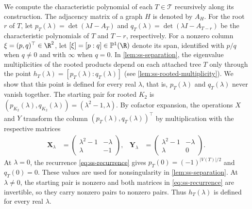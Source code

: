We compute the characteristic polynomial of each $T\in\mathcal T$
recursively along its construction.
The adjacency matrix of a graph $H$ is denoted by $A_H$.
For the root $r$ of $T$, let $p_T(\lambda)=\det(\lambda I-A_T)$ and
$q_T(\lambda)=\det(\lambda I-A_{T-r})$ be the characteristic polynomials of $T$ and
$T-r$, respectively.
For a nonzero column $\xi=(p,q)^{\top}\in\R^2$, let
$[\xi]=[p:q]\in\mathbb P^1(\R)$ denote its span, identified with $p/q$ when $q\ne0$
and with $\infty$ when $q=0$.
In \cref{lem:ss-separation}, the eigenvalue multiplicities of the
rooted products depend on each attached tree $T$ only through the point
$h_T(\lambda)=[p_T(\lambda):q_T(\lambda)]$
(see \cref{lem:ss-rooted-multiplicity}).
We show that this point is defined for every real $\lambda$, that is,
$p_T(\lambda)$ and $q_T(\lambda)$ never vanish together.
The starting pair for rooted $K_2$ is
$(p_{K_2}(\lambda),q_{K_2}(\lambda))=(\lambda^2-1,\lambda)$.
By cofactor expansion, the operations $X$ and $Y$
transform the column $(p_T(\lambda),q_T(\lambda))^{\top}$ by multiplication
with the respective matrices
\begin{equation}\label{eq:ss-recurrence}
 \begin{aligned}
 \mathbf{X}_\lambda&=\begin{pmatrix}\lambda^2-1&-\lambda\\\lambda&-1\end{pmatrix},
 &\mathbf{Y}_\lambda&=\begin{pmatrix}\lambda^2-1&-\lambda\\\lambda&0\end{pmatrix}.
 \end{aligned}
\end{equation}
At $\lambda=0$, the recurrence \cref{eq:ss-recurrence} gives
$p_T(0)=(-1)^{|V(T)|/2}$ and $q_T(0)=0$.
These values are used for nonsingularity in \cref{lem:ss-separation}.
At $\lambda\ne0$, the starting pair is nonzero and both
matrices in \cref{eq:ss-recurrence} are invertible, so they carry
nonzero pairs to nonzero pairs.
Thus $h_T(\lambda)$ is defined for every real $\lambda$.

